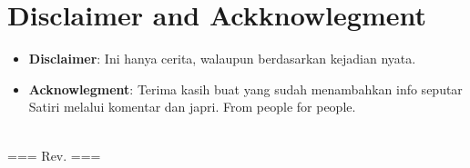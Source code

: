 \thispagestyle{plain}

\chapter*{Disclaimer and Ackknowlegment}

\noindent
\begin{itemize}
\item \textbf{Disclaimer}: Ini hanya cerita, walaupun berdasarkan kejadian nyata.
\item \textbf{Acknowlegment}:  Terima kasih buat yang sudah menambahkan info seputar Satiri melalui komentar dan japri. From people for people.
\end{itemize}

\vspace*{15mm}
\textbf{\Large \pengarangs}
\\[10pt]
\noindent
=== Rev. \rev ===


